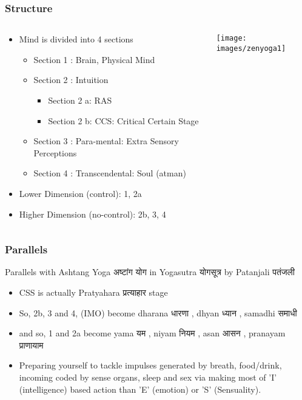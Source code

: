 \begin{frame}[fragile]
\frametitle{Structure}

\begin{columns}[T] %
\begin{column}{.48\textwidth}
\begin{itemize}
\item Mind is divided into 4 sections
	\begin{itemize}
	\item Section 1 : Brain, Physical Mind
	\item Section 2 : Intuition
	\begin{itemize}
		\item Section 2 a: RAS
		\item Section 2 b: CCS: Critical Certain Stage
	\end{itemize}
	\item Section 3 : Para-mental: Extra Sensory Perceptions
	\item Section 4 : Transcendental: Soul (atman)
	\end{itemize}
\item Lower Dimension (control): 1, 2a
\item Higher Dimension (no-control): 2b, 3, 4
\end{itemize}
\end{column}%
\hfill%
\begin{column}{.48\textwidth}
 \begin{center}
\texttt{[image: images/zenyoga1]}
\end{center}

\end{column}%
\end{columns}
\end{frame}

\begin{frame}[fragile]\frametitle{Parallels}
Parallels with Ashtang Yoga अष्टांग योग in Yogasutra योगसूत्र by Patanjali पतंजली 


\begin{itemize}
\item CSS is actually Pratyahara प्रत्याहार stage
\item So, 2b, 3 and 4, (IMO) become dharana धारणा , dhyan ध्यान , samadhi समाधी 
\item and so, 1 and 2a become yama यम  , niyam नियम , asan आसन , pranayam प्राणायाम 
\item Preparing yourself to tackle impulses generated by breath, food/drink, incoming coded by sense organs, sleep and sex via making most of 'I' (intelligence) based action than 'E' (emotion) or 'S' (Sensuality).
\end{itemize}

\end{frame}

